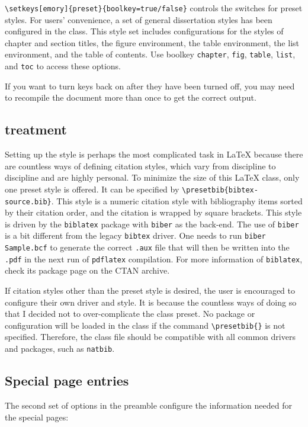 \documentclass[final]{emory}
\begin{document}
\Verb|\setkeys[emory]{preset}{boolkey=true/false}| controls the switches for preset styles.
For users' convenience, a set of general dissertation styles has been configured in the class. 
This style set includes configurations for the styles of chapter and section 
titles, the figure environment, the table environment, the list environment, 
and the table of contents. Use boolkey \Verb|chapter|, \Verb|fig|, \Verb|table|, 
\Verb|list|, and \Verb|toc| to access these options.

If you want to turn keys back on after they have been turned off, you may need 
to recompile the document more than once to get the correct output.

\subsection{{\BibTeX{}} treatment}
Setting up the \BibTeX{} style is perhaps the most complicated task in \LaTeX{} 
because there are countless ways of defining citation styles, which vary from 
discipline to discipline and are highly personal.
To minimize the size of this \LaTeX{} class, only one preset \BibTeX{} style
is offered. It can be specified by \Verb|\presetbib{bibtex-source.bib}|.
This style is a numeric citation style with bibliography items sorted by their citation order,
and the citation is wrapped by square brackets. 
This style is driven by the \Verb|biblatex| package with \Verb|biber| as the 
back-end. 
The use of \Verb|biber| is a bit different from the legacy \Verb|bibtex| driver.
One needs to run \Verb|biber Sample.bcf| to generate the correct \Verb|.aux| 
file that will then be written into the \Verb|.pdf| in the next run of 
\Verb|pdflatex| compilation. For more information of \Verb|biblatex|, check its 
package page on the CTAN archive. 

If citation styles other than the preset style is desired, the user is 
encouraged to configure their own \BibTeX{} driver and style.
It is because the countless ways of doing so that I decided not to 
over-complicate the class preset.
No \BibTeX{} package or configuration will be loaded in the class if the 
command \Verb|\presetbib{}| is not specified. 
Therefore, the class file should be compatible with all common \BibTeX{} 
drivers and packages, such as \Verb|natbib|. 


\subsection{Special page entries}
The second set of options in the preamble configure the information needed for the special pages:
\end{document}
